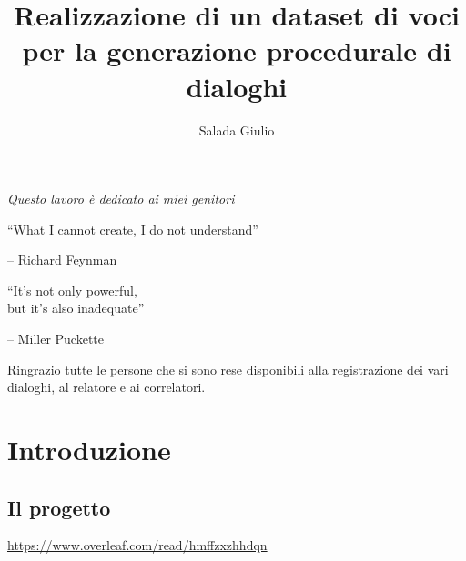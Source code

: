 \documentclass[12pt]{report}
\title{Realizzazione di un dataset di voci\\ per la generazione procedurale di dialoghi}
\author{Salada Giulio}
\begin{document}
\makefrontpage
\beforepreface

% 
%

{\raggedleft \large \sl Questo lavoro \`{e} dedicato ai miei genitori\\
	
	\vspace{2cm}
	
	``What I cannot create, I do not understand''
	
	\bigskip
	
	\--- Richard Feynman\\
  
	\vspace{2cm}
	
	``It's not only powerful,\\but it's also inadequate''
	
	\bigskip
	
	\--- Miller Puckette\\}
         
% 
%


%
%

{\raggedright \large \sl 

Ringrazio tutte le persone che si sono rese disponibili alla registrazione dei vari dialoghi, al relatore e ai correlatori.
\\}

%
%

\afterpreface

% 
% 

\chapter{Introduzione}
\label{cap:introduzione}

\section{Il progetto}
\begin{center}
    \url{https://www.overleaf.com/read/hmffzxzhhdqn}
\end{center}
\end{document}
